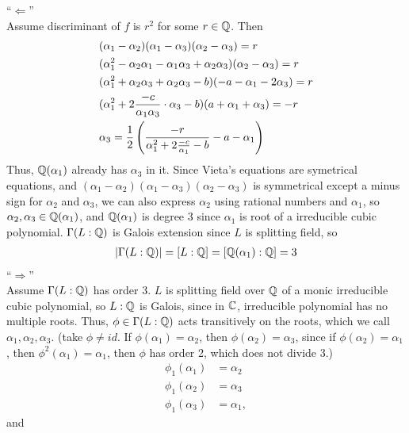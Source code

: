 \documentclass{article}
\begin{document}
\begin{homeworkProblem}
    ``$\Leftarrow$''\\
    Assume discriminant of $f$ is $r^2$ for some $r \in \mathbb{Q}$. Then
    \begin{align}
        &(\alpha_1 - \alpha_2)(\alpha_1 - \alpha_3)(\alpha_2 - \alpha_3) = r\\
        &(\alpha_1^2 - \alpha_2 \alpha_1 - \alpha_1 \alpha_3 + \alpha_2 \alpha_3)(\alpha_2 - \alpha_3) = r\\
        &(\alpha_1^2 + \alpha_2 \alpha_3 + \alpha_2 \alpha_3 - b)(-a - \alpha_1 - 2 \alpha_3) = r\\
        &(\alpha_1^2 + 2 \frac{ -c }{ \alpha_1 \alpha_3 } \cdot \alpha_3 - b) ( a + \alpha_1 + \alpha_3) = -r\\
        &\alpha_3 = \frac{ 1 }{ 2 } \left(  \frac{ -r }{ \alpha_1^2 + 2 \frac{ -c }{ \alpha_1 } - b } - a - \alpha_1 \right)
    \end{align}
    Thus, $\mathbb{Q}(\alpha_1)$ already has $\alpha_3$ in it. Since Vieta's equations are symetrical equations, and $(\alpha_1 - \alpha_2)(\alpha_1 - \alpha_3)(\alpha_2 - \alpha_3)$
    is symmetrical except a minus sign for $\alpha_2$ and $\alpha_3$, we can also express $\alpha_2$ using rational numbers and $\alpha_1$, 
    so $\alpha_2, \alpha_3 \in \mathbb{Q}(\alpha_1)$, and $\mathbb{Q}(\alpha_1)$ is degree 3 since $\alpha_1$ is root of a irreducible cubic polynomial.
    $\Gamma(L:\mathbb{Q})$ is Galois extension since $L$ is splitting field, so
    \begin{align}
        \lvert \Gamma (L:\mathbb{Q}) \rvert = [L:\mathbb{Q}] = [\mathbb{Q}(\alpha_1):\mathbb{Q}] = 3
    \end{align}
    ``$\Rightarrow$''\\
    Assume $\Gamma(L:\mathbb{Q})$ has order 3. $L$ is splitting field over $\mathbb{Q}$ of a monic irreducible cubic polynomial, so $L:\mathbb{Q}$ is Galois, since in $\mathbb{C}$, 
    irreducible polynomial has no multiple roots. Thus, $\phi \in \Gamma (L:\mathbb{Q})$ acts transitively on the roots, which we call $\alpha_1, \alpha_2, \alpha_3$.
    (take $\phi \neq id$. If $\phi (\alpha_1) = \alpha_2$, then $\phi (\alpha_2) = \alpha_3$, since if $\phi (\alpha_2) = \alpha_1$, then
    $\phi^2(\alpha_1) = \alpha_1$, then $\phi$ has order 2, which does not divide 3.)
    \begin{align}
        \phi_1(\alpha_1) &= \alpha_2 \\
        \phi_1 (\alpha_2) &= \alpha_3 \\
        \phi_1 (\alpha_3) &= \alpha_1,
    \end{align}
    and 
    \begin{align}

\end{align}
\end{homeworkProblem}
\end{document}
